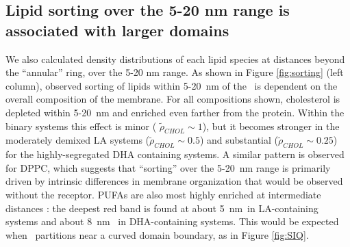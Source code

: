 	\subsection{Lipid sorting over the 5-20 nm range is associated with larger domains  } \label{Sorting}

	We also calculated density distributions of each lipid species at distances beyond the ``annular'' ring, over the 5-20 nm range.    As shown in Figure \ref{fig:sorting} (left column), observed sorting of lipids within {5-20~nm} of the \nachr~is dependent on the overall composition of the membrane. For all compositions shown, cholesterol is depleted within 5-20~nm and enriched even farther from the protein.  Within the binary systems this effect is minor ( $\tilde\rho_{CHOL} \sim 1$), but it becomes stronger in the moderately demixed LA systems ($\tilde\rho_{CHOL} \sim 0.5$) and substantial ($\tilde\rho_{CHOL} \sim 0.25$) for the highly-segregated DHA containing systems.  A similar pattern is observed for DPPC, which suggests that ``sorting'' over the 5-20~nm range is primarily driven by intrinsic differences in membrane organization that would be observed without the receptor. PUFAs are also most highly enriched at intermediate distances : the deepest red band is found at about 5~nm~in LA-containing systems and about 8~nm~ in DHA-containing systems.  This would be expected when \nachr~partitions near a curved domain boundary, as in Figure \ref{fig:SIQ}.      			

